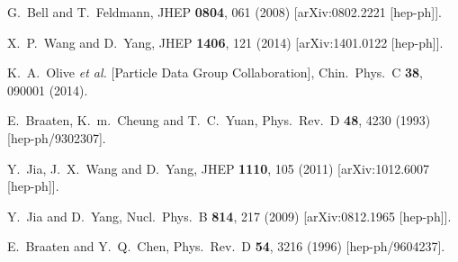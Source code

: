 \documentclass[english,preprint,aps,prd,showpacs,superscriptaddress,nofootinbib,tightenlines]{revtex4}
\begin{document}
\begin{thebibliography}{99}
G.~Bell and T.~Feldmann,
JHEP {\bf 0804}, 061 (2008)   [arXiv:0802.2221 [hep-ph]].

X.~P.~Wang and D.~Yang,
JHEP {\bf 1406}, 121 (2014)   [arXiv:1401.0122 [hep-ph]].

  K.~A.~Olive {\it et al.} [Particle Data Group Collaboration],
  Chin.\ Phys.\ C {\bf 38}, 090001 (2014).




  E.~Braaten, K.~m.~Cheung and T.~C.~Yuan,
  Phys.\ Rev.\ D {\bf 48}, 4230 (1993)  [hep-ph/9302307].



  Y.~Jia, J.~X.~Wang and D.~Yang,
  JHEP {\bf 1110}, 105 (2011)  [arXiv:1012.6007 [hep-ph]].  %

  Y.~Jia and D.~Yang,
  Nucl.\ Phys.\ B {\bf 814}, 217 (2009)  [arXiv:0812.1965 [hep-ph]].  %


E.~Braaten and Y.~Q.~Chen,
Phys.\ Rev.\ D {\bf 54}, 3216 (1996)   [hep-ph/9604237].



\end{thebibliography}
\end{document}
